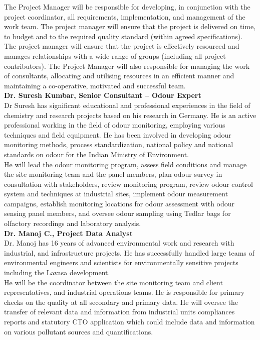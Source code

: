 The Project Manager will be responsible for developing, in conjunction with the project coordinator, all requirements, implementation, and management of the work team. The project manager will ensure that the project is delivered on time, to budget and to the required quality standard (within agreed specifications). The project manager will ensure that the project is effectively resourced and manages relationships with a wide range of groups (including all project contributors). The Project Manager will also responsible for managing the work of consultants, allocating and utilising resources in an efficient manner and maintaining a co-operative, motivated and successful team.\\

\textbf{Dr. Suresh Kumbar, Senior Consultant – Odour Expert}\\
Dr Suresh has significant educational and professional experiences in the field of chemistry and research projects based on his research in Germany. He is an active professional working in the field of odour monitoring, employing various techniques and field equipment. He has been involved in developing odour monitoring methods, process standardization, national policy and national standards on odour for the Indian Ministry of Environment.	\\
He will lead the odour monitoring program, assess field conditions and manage the site monitoring team and the panel members, plan odour survey in consultation with stakeholders, review monitoring program, review odour control system and techniques at industrial sites, implement odour measurement campaigns, establish monitoring locations for odour assessment with odour sensing panel members, and oversee odour sampling using Tedlar bags for olfactory recordings and laboratory analysis.\\

\textbf{Dr. Manoj C., Project Data Analyst}\\
Dr. Manoj has 16 years of advanced environmental work and research with industrial, and infrastructure projects. He has successfully handled  large teams of environmental engineers and scientists for environmentally sensitive projects including the Lavasa development. \\
He will be the coordinator between the site monitoring team and client representatives, and industrial operations teams. He is responsible for primary checks on the quality at all secondary and primary data. He will oversee the transfer of relevant data and information from industrial units compliances reports and statutory CTO application which could include data and information on various pollutant sources and quantifications.\\

